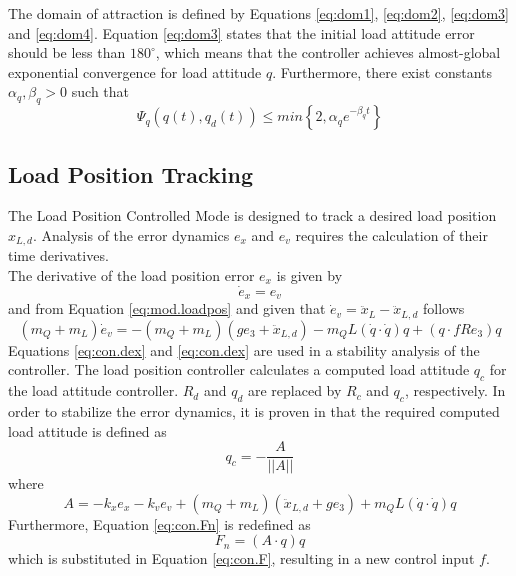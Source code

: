 The domain of attraction is defined by Equations \ref{eq:dom1}, \ref{eq:dom2}, \ref{eq:dom3} and \ref{eq:dom4}. Equation \ref{eq:dom3} states that the initial load attitude error should be less than $ 180^\circ $, which means that the controller achieves almost-global exponential convergence for load attitude $ q $.
Furthermore, there exist constants $ \alpha_q,\beta_q>0 $ such that
\begin{equation}\label{eq:con.proofPsiq}
\Psi_q(q(t),q_d(t)) \leq min\left\lbrace 2,\alpha_qe^{-\beta_qt}\right\rbrace 
\end{equation}

\subsection{Load Position Tracking}\label{sec:con.loadpos}
The Load Position Controlled Mode is designed to track a desired load position $ x_{L,d} $. 
Analysis of the error dynamics $ e_x $ and $ e_v $ requires the calculation of their time derivatives.\\
The derivative of the load position error $ e_x $ is given by
\begin{equation}\label{eq:con.dex}
\dot{e}_x = e_v
\end{equation}
and from Equation \ref{eq:mod.loadpos} and given that $ \dot{e}_v=\ddot{x}_L-\ddot{x}_{L,d} $ follows
\begin{equation}\label{eq:con.dev}
(m_Q+m_L)\dot{e}_v=-(m_Q+m_L)(ge_3+\ddot{x}_{L,d})-m_QL(\dot{q}\cdot\dot{q})q+(q\cdot fRe_3)q
\end{equation}
Equations \ref{eq:con.dex} and \ref{eq:con.dex} are used in a stability analysis of the controller. 
The load position controller calculates a computed load attitude $ q_c$ for the load attitude controller. $ R_d $ and $ q_d $ are replaced by $ R_c $ and $ q_c $, respectively. 
In order to stabilize the error dynamics, it is proven in \cite{Sreenath2013c} that the required computed load attitude is defined as
\begin{equation}\label{eq:con.q}
q_c = - \frac{A}{||A||}
\end{equation}
where
\begin{equation}\label{key}
A = -k_xe_x-k_ve_v+(m_Q+m_L)(\ddot{x}_{L,d}+ge_3)+m_QL(\dot{q}\cdot\dot{q})q
\end{equation}
Furthermore, Equation \ref{eq:con.Fn} is redefined as
\begin{equation}\label{key}
F_n=(A\cdot q)q
\end{equation}
which is substituted in Equation \ref{eq:con.F}, resulting in a new control input $ f $. 


